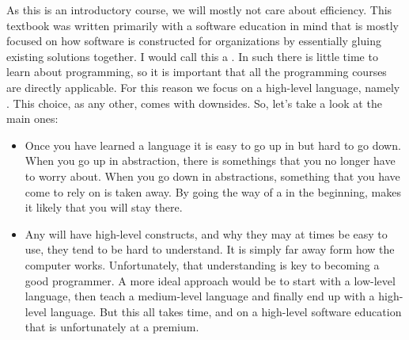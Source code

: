 As this is an introductory course, we will mostly not care about efficiency. This textbook was written primarily with a software education in mind that is mostly focused on how software is constructed for organizations by essentially gluing existing solutions together. I would call this a . In such there is little time to learn about programming, so it is important that all the programming courses are directly applicable. For this reason we focus on a high-level language, namely \csharp. This choice, as any other, comes with downsides. So, let's take a look at the main ones:
\begin{itemize}
  \item Once you have learned a language it is easy to go up in  but hard to go down. When you go up in abstraction, there is somethings that you no longer have to worry about. When you go down in abstractions, something that you have come to rely on is taken away. By going the way of a  in the beginning, makes it likely that you will stay there.
  \item Any  will have high-level constructs, and why they may at times be easy to use, they tend to be hard to understand. It is simply far away form how the computer works. Unfortunately, that understanding is key to becoming a good programmer. A more ideal approach would be to start with a low-level language, then teach a medium-level language and finally end up with a high-level language. But this all takes time, and on a high-level software education that is unfortunately at a premium.
\end{itemize}

